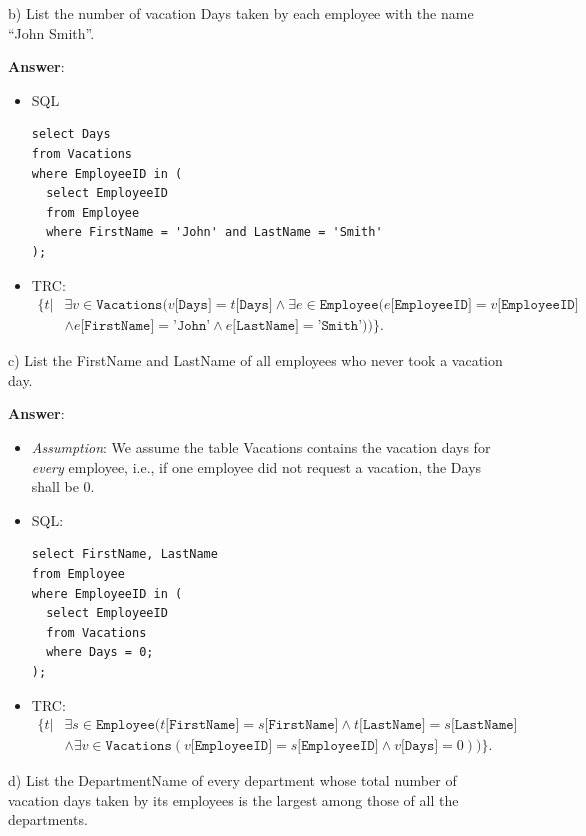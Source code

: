 \documentclass{article}
\begin{document}
b) List the number of vacation Days taken by each employee with the name ``John Smith''.

{\bf Answer}:
\begin{itemize}
\item SQL
\begin{verbatim}
select Days
from Vacations
where EmployeeID in (
  select EmployeeID
  from Employee
  where FirstName = 'John' and LastName = 'Smith'
);
\end{verbatim}

\item TRC:
$$\begin{aligned}
\{t | & \exists v \in \texttt{Vacations} (v\texttt{[Days]} = t\texttt{[Days]}
 \wedge \exists e \in \texttt{Employee} (e\texttt{[EmployeeID]} = v\texttt{[EmployeeID]} \\
&\wedge e\texttt{[FirstName]} = \texttt{'John'} \wedge e\texttt{[LastName]} = \texttt{'Smith'}))\}.
\end{aligned}$$
\end{itemize}


c) List the FirstName and LastName of all employees who never took a vacation day.

{\bf Answer}:
\begin{itemize}
\item \emph{Assumption}: We assume the table Vacations contains the vacation days for \emph{every} employee, i.e., if one employee did not request a vacation, the Days shall be 0.
\item SQL:
\begin{verbatim}
select FirstName, LastName
from Employee
where EmployeeID in (
  select EmployeeID
  from Vacations
  where Days = 0;
);
\end{verbatim}

\item TRC:
$$\begin{aligned}
\{t | & \exists s \in \texttt{Employee} (t\texttt{[FirstName]} = s\texttt{[FirstName]} \wedge t\texttt{[LastName]} = s\texttt{[LastName]}\\
& \wedge \exists v \in \texttt{Vacations} (v\texttt{[EmployeeID]} = s\texttt{[EmployeeID]} 
\wedge v\texttt{[Days]} = 0))\}.
\end{aligned}$$
\end{itemize}

d) List the DepartmentName of every department whose total number of vacation days taken by its employees is the largest among those of all the departments.
\end{document}
